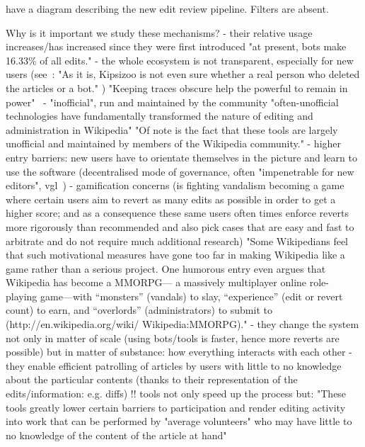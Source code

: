 \cite{AstHal2018} have a diagram describing the new edit review pipeline. Filters are absent.

Why is it important we study these mechanisms?
- their relative usage increases/has increased since they were first introduced
    \cite{GeiRib2010}
    "at present, bots make 16.33\% of all edits."
- the whole ecosystem is not transparent, especially for new users (see~\cite{ForGei2012}: "As it is, Kipsizoo is not even
sure whether a real person who deleted the articles or a bot." )
"Keeping traces obscure help the powerful to remain in power"~\cite{ForGei2012}
- "inofficial", run and maintained by the community
    \cite{GeiRib2010}
    "often-unofficial technologies have fundamentally
    transformed the nature of editing and administration in
    Wikipedia"
    "Of note is the fact that these tools are largely
    unofficial and maintained by members of the Wikipedia
    community."
- higher entry barriers: new users have to orientate themselves in the picture and learn to use the software (decentralised mode of governance, often "impenetrable for new editors", vgl~\cite{ForGei2012})
- gamification concerns (is fighting vandalism becoming a game where certain users aim to revert as many edits as possible in order to get a higher score; and as a consequence these same users often times enforce reverts more rigorously than recommended and also pick cases that are easy and fast to arbitrate and do not require much additional research)
    \cite{HalRied2012}
    "Some Wikipedians feel that such
    motivational measures have gone
    too far in making Wikipedia like a
    game rather than a serious project.
    One humorous entry even argues that
    Wikipedia has become a MMORPG—
    a massively multiplayer online role-
    playing game—with “monsters”
    (vandals) to slay, “experience”
    (edit or revert count) to earn, and
    “overlords” (administrators) to submit
    to (http://en.wikipedia.org/wiki/
    Wikipedia:MMORPG)."
- they change the system not only in matter of scale (using bots/tools is faster, hence more reverts are possible) but in matter of substance: how everything interacts with each other
- they enable efficient patrolling of articles by users with little to no knowledge about the particular contents (thanks to their representation of the edits/information: e.g. diffs)
    \cite{GeiRib2010}
    !! tools not only speed up the process but:
    "These tools greatly lower certain barriers to participation and render editing
    activity into work that can be performed by "average
    volunteers" who may have little to no knowledge of the
    content of the article at hand"


